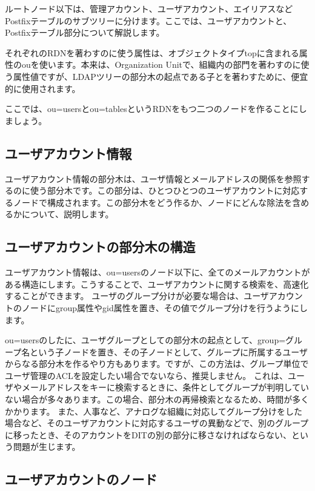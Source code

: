 ルートノード以下は、管理アカウント、ユーザアカウント、エイリアスなどPostfixテーブルのサブツリーに分けます。ここでは、ユーザアカウントと、Postfixテーブル部分について解説します。

それぞれのRDNを著わすのに使う属性は、オブジェクトタイプtopに含まれる属性のouを使います。本来は、Organization Unitで、組織内の部門を著わすのに使う属性値ですが、LDAPツリーの部分木の起点である子とを著わすために、便宜的に使用されます。

ここでは、ou=usersとou=tablesというRDNをもつ二つのノードを作ることにしましょう。

\subsection{ユーザアカウント情報}

ユーザアカウント情報の部分木は、ユーザ情報とメールアドレスの関係を参照するのに使う部分木です。この部分は、ひとつひとつのユーザアカウントに対応するノードで構成されます。この部分木をどう作るか、ノードにどんな除法を含めるかについて、説明します。

\subsection{ユーザアカウントの部分木の構造}

ユーザアカウント情報は、ou=usersのノード以下に、全てのメールアカウントがある構造にします。こうすることで、ユーザアカウントに関する検索を、高速化することができます。
ユーザのグループ分けが必要な場合は、ユーザアカウントのノードにgroup属性やgid属性を置き、その値でグループ分けを行うようにします。

ou=usersのしたに、ユーザグループとしての部分木の起点として、group=グループ名という子ノードを置き、その子ノードとして、グループに所属するユーザからなる部分木を作るやり方もあります。ですが、この方法は、グループ単位でユーザ管理のACLを設定したい場合でないなら、推奨しません。
これは、ユーザやメールアドレスをキーに検索するときに、条件としてグループが判明していない場合が多々あります。この場合、部分木の再帰検索となるため、時間が多くかかります。
また、人事など、アナログな組織に対応してグループ分けをした場合など、そのユーザアカウントに対応するユーザの異動などで、別のグループに移ったとき、そのアカウントをDITの別の部分に移さなければならない、という問題が生じます。

\subsection{ユーザアカウントのノード}

